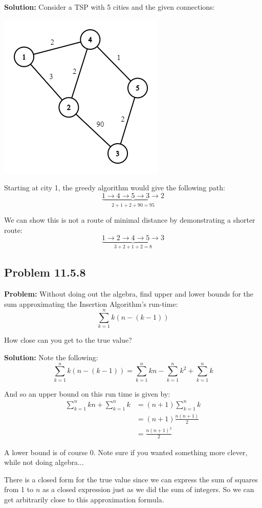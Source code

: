 \documentclass{article}
\begin{document}
\noindent\textbf{Solution:} Consider a TSP with 5 cities and the given connections:
\begin{center}
  \includegraphics[scale=.5]{graph.png}
\end{center}
Starting at city 1, the greedy algorithm would give the following path:
$$\underbrace{1\to4\to5\to3\to2}_{2+1+2+90=95}$$

We can show this is not a route of minimal distance by demonstrating a shorter route:
$$\underbrace{1\to2\to4\to5\to3}_{3+2+1+2=8}$$

\subsection*{Problem 11.5.8}
\noindent\textbf{Problem:} Without doing out the algebra, find upper and lower bounds for the sum approximating the Insertion Algorithm’s run-time:
$$\sum^n_{k=1}k(n-(k-1))$$ 

How close can you get to the true value?
\bigskip

\noindent\textbf{Solution:} Note the following:
$$\sum^n_{k=1}k(n-(k-1))=\sum^n_{k=1}kn-\sum^n_{k=1}k^2+\sum^n_{k=1}k$$

And so an upper bound on this run time is given by:
\begin{align*}
  \sum^n_{k=1}kn+\sum^n_{k=1}k&=(n+1)\sum^n_{k=1}k\\
  &=(n+1)\frac{n(n+1)}{2}\\
  &=\frac{n(n+1)^2}{2}
\end{align*}

A lower bound is of course 0. Note sure if you wanted something more clever, while not doing algebra...

There is a closed form for the true value since we can express the sum of squares from 1 to $n$ as a closed expression just as we did the sum of integers. So we can get arbitrarily close to this approximation formula.
\end{document}
